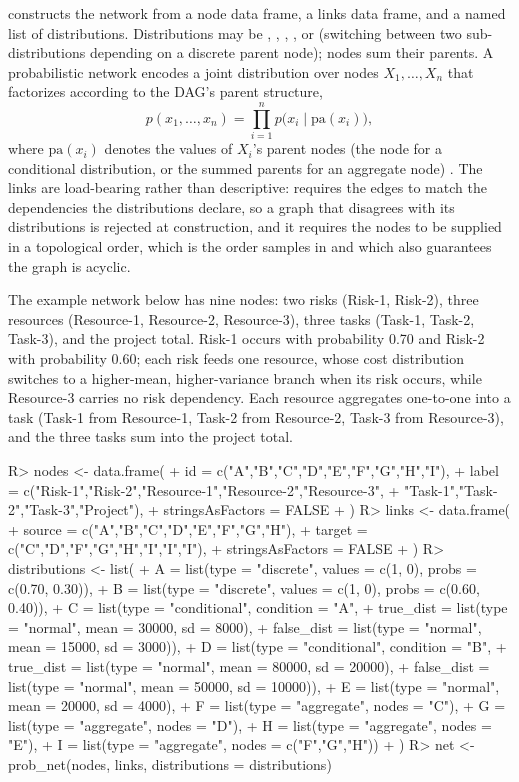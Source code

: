 \documentclass[
]{jss}
\begin{document}
 constructs the network from a node data frame, a
links data frame, and a named list of distributions. Distributions may
be , , , , or
 (switching between two sub-distributions depending on
a discrete parent node);  nodes sum their parents. A
probabilistic network encodes a joint distribution over nodes
\(X_1,\ldots,X_n\) that factorizes according to the DAG's parent
structure,
\[p(x_1, \ldots, x_n) = \prod_{i=1}^{n} p\bigl(x_i \mid \mathrm{pa}(x_i)\bigr),\]
where \(\mathrm{pa}(x_i)\) denotes the values of \(X_i\)'s parent nodes
(the  node for a conditional distribution, or the summed
parents for an aggregate node) \citep{Pearl2009}. The links are
load-bearing rather than descriptive:  requires the
edges to match the dependencies the distributions declare, so a graph
that disagrees with its distributions is rejected at construction, and
it requires the nodes to be supplied in a topological order, which is
the order  samples in and which also guarantees
the graph is acyclic.

The example network below has nine nodes: two risks (Risk-1, Risk-2),
three resources (Resource-1, Resource-2, Resource-3), three tasks
(Task-1, Task-2, Task-3), and the project total. Risk-1 occurs with
probability 0.70 and Risk-2 with probability 0.60; each risk feeds one
resource, whose cost distribution switches to a higher-mean,
higher-variance branch when its risk occurs, while Resource-3 carries no
risk dependency. Each resource aggregates one-to-one into a task (Task-1
from Resource-1, Task-2 from Resource-2, Task-3 from Resource-3), and
the three tasks sum into the project total.

\begin{CodeChunk}
\begin{CodeInput}
R> nodes <- data.frame(
+   id = c("A","B","C","D","E","F","G","H","I"),
+   label = c("Risk-1","Risk-2","Resource-1","Resource-2","Resource-3",
+             "Task-1","Task-2","Task-3","Project"),
+   stringsAsFactors = FALSE
+ )
R> links <- data.frame(
+   source = c("A","B","C","D","E","F","G","H"),
+   target = c("C","D","F","G","H","I","I","I"),
+   stringsAsFactors = FALSE
+ )
R> distributions <- list(
+   A = list(type = "discrete", values = c(1, 0), probs = c(0.70, 0.30)),
+   B = list(type = "discrete", values = c(1, 0), probs = c(0.60, 0.40)),
+   C = list(type = "conditional", condition = "A",
+     true_dist  = list(type = "normal", mean = 30000, sd = 8000),
+     false_dist = list(type = "normal", mean = 15000, sd = 3000)),
+   D = list(type = "conditional", condition = "B",
+     true_dist  = list(type = "normal", mean = 80000, sd = 20000),
+     false_dist = list(type = "normal", mean = 50000, sd = 10000)),
+   E = list(type = "normal", mean = 20000, sd = 4000),
+   F = list(type = "aggregate", nodes = "C"),
+   G = list(type = "aggregate", nodes = "D"),
+   H = list(type = "aggregate", nodes = "E"),
+   I = list(type = "aggregate", nodes = c("F","G","H"))
+ )
R> net <- prob_net(nodes, links, distributions = distributions)
\end{CodeInput}
\end{CodeChunk}
\end{document}
